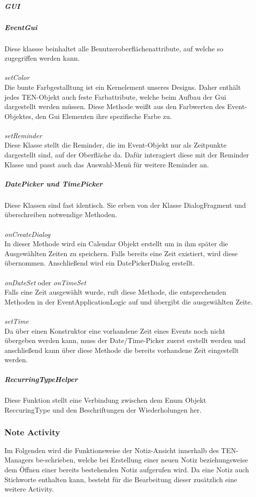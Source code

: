 \subparagraph{GUI}
\subparagraph*{EventGui}
Diese klassse beinhaltet alle Benutzeroberflächenattribute, auf welche so zugegriffen werden kann.\\
\\
\textit{setColor}\\
Die bunte Farbgestalltung ist ein Kernelement unseres Designs. Daher enthält jedes TEN-Objekt auch feste Farbattribute, welche beim Aufbau der Gui dargestellt werden müssen. Diese Methode weißt aus den Farbwerten des Event-Objektes, den Gui Elementen ihre spezifische Farbe zu.\\
\\
\textit{setReminder}\\
Diese Klasse stellt die Reminder, die im Event-Objekt nur als Zeitpunkte dargestellt sind, auf der Oberfläche da. Dafür interagiert diese mit der Reminder Klasse und passt auch das Auswahl-Menü für weitere Reminder an.

\subparagraph{DatePicker und TimePicker}
Diese Klassen sind fast identisch. Sie erben von der Klasse DialogFragment und überschreiben notwendige Methoden.\\
\\
\textit{onCreateDialog}\\
In dieser Methode wird ein Calendar Objekt erstellt um in ihm später die Ausgewählten Zeiten zu speichern. Falls bereits eine Zeit existiert, wird diese übernommen. Anschließend wird ein DatePickerDialog erstellt.\\
\\
\textit{onDateSet} oder \textit{onTimeSet}\\
Falls eine Zeit ausgewählt wurde, ruft diese Methode, die entsprechenden Methoden in der EventApplicationLogic auf und übergibt die ausgewählten Zeite.\\
\\
\textit{setTime}\\
Da über einen Konstruktor eine vorhandene Zeit eines Events noch nicht übergeben werden kann, muss der Date/Time-Picker zuerst erstellt werden und anschließend kann über diese Methode die bereits vorhandene Zeit eingestellt werden.

\subparagraph{RecurringTypeHelper}
Diese Funktion stellt eine Verbindung zwischen dem Enum Objekt ReccuringType und den Beschriftungen der Wiederholungen her.

\newpage
\subsubsection{Note Activity}
Im Folgenden wird die Funktionsweise der Notiz-Ansicht innerhalb des TEN-Managers be-schrieben, welche bei Erstellung einer neuen Notiz beziehungsweise dem Öffnen einer bereits bestehenden Notiz aufgerufen wird. Da eine Notiz auch Stichworte enthalten kann, besteht für die Bearbeitung dieser zusätzlich eine weitere Activity.

